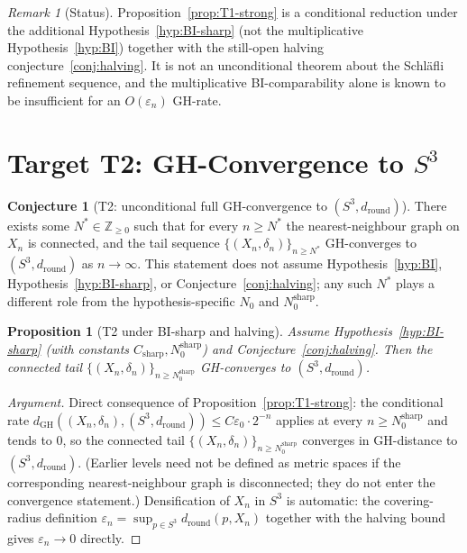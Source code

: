 \documentclass[12pt]{article}
\newtheorem{proposition}[theorem]{Proposition}
\theoremstyle{definition}
\newtheorem{conjecture}[theorem]{Conjecture}
\theoremstyle{remark}
\newtheorem{remark}[theorem]{Remark}
\begin{document}
\begin{remark}[Status]
Proposition~\ref{prop:T1-strong} is a conditional reduction under the additional Hypothesis~\ref{hyp:BI-sharp} (not the multiplicative Hypothesis~\ref{hyp:BI}) together with the still-open halving conjecture~\ref{conj:halving}. It is not an unconditional theorem about the Schl\"afli refinement sequence, and the multiplicative BI-comparability alone is known to be insufficient for an $O(\varepsilon_n)$ GH-rate.
\end{remark}

\section{Target T2: GH-Convergence to $S^3$}\label{sec:T2}

\begin{conjecture}[T2: unconditional full GH-convergence to $(S^3, d_{\mathrm{round}})$]\label{conj:T2}
There exists some $N^* \in \mathbb{Z}_{\geq 0}$ such that for every $n \geq N^*$ the nearest-neighbour graph on $X_n$ is connected, and the tail sequence $\{(X_n, \delta_n)\}_{n \geq N^*}$ GH-converges to $(S^3, d_{\mathrm{round}})$ as $n \to \infty$. This statement does not assume Hypothesis~\ref{hyp:BI}, Hypothesis~\ref{hyp:BI-sharp}, or Conjecture~\ref{conj:halving}; any such $N^*$ plays a different role from the hypothesis-specific $N_0$ and $N_0^{\mathrm{sharp}}$.
\end{conjecture}

\begin{proposition}[T2 under BI-sharp and halving]\label{prop:T2-conditional}
Assume Hypothesis~\ref{hyp:BI-sharp} (with constants $C_{\mathrm{sharp}}, N_0^{\mathrm{sharp}}$) and Conjecture~\ref{conj:halving}. Then the connected tail $\{(X_n, \delta_n)\}_{n \geq N_0^{\mathrm{sharp}}}$ GH-converges to $(S^3, d_{\mathrm{round}})$.
\end{proposition}

\begin{proof}[Argument]
Direct consequence of Proposition~\ref{prop:T1-strong}: the conditional rate $d_{\mathrm{GH}}((X_n,\delta_n),(S^3,d_{\mathrm{round}})) \leq C \varepsilon_0 \cdot 2^{-n}$ applies at every $n \geq N_0^{\mathrm{sharp}}$ and tends to $0$, so the connected tail $\{(X_n, \delta_n)\}_{n \geq N_0^{\mathrm{sharp}}}$ converges in GH-distance to $(S^3, d_{\mathrm{round}})$. (Earlier levels need not be defined as metric spaces if the corresponding nearest-neighbour graph is disconnected; they do not enter the convergence statement.) Densification of $X_n$ in $S^3$ is automatic: the covering-radius definition $\varepsilon_n = \sup_{p \in S^3} d_{\mathrm{round}}(p, X_n)$ together with the halving bound gives $\varepsilon_n \to 0$ directly.
\end{proof}
\end{document}
